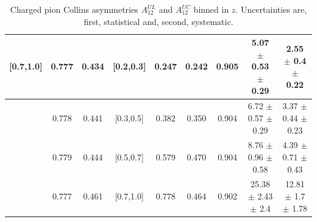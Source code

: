 \documentclass[aps,prX,preprint,groupedaddress,linenumbers]{revtex4-1}
\begin{document}
\begin{table}[H]
\begin{tabular}{|c|c|c|c|c|c|c|c|c|}
[0.7,1.0]	&	0.777	&	0.434	&	[0.2,0.3]	&	0.247	&	0.242	&	0.905	&5.07  $\pm$ 0.53  $\pm$ 0.29   &	2.55  $\pm$ 0.4  $\pm$ 0.22   \\ \hline
[0.7,1.0]	&	0.778	&	0.441	&	[0.3,0.5]	&	0.382	&	0.350	&	0.904	&6.72  $\pm$ 0.57  $\pm$ 0.29   &	3.37  $\pm$ 0.44  $\pm$ 0.23  \\ \hline
[0.7,1.0]	&	0.779	&	0.444	&	[0.5,0.7]	&	0.579	&	0.470	&	0.904	&8.76  $\pm$ 0.96  $\pm$ 0.58   &	4.39  $\pm$ 0.71  $\pm$ 0.43  \\ \hline
[0.7,1.0]	&	0.777	&	0.461	&	[0.7,1.0]	&	0.778	&	0.464	&	0.902	&25.38  $\pm$ 2.43  $\pm$ 2.4   &	12.81  $\pm$ 1.7  $\pm$ 1.78  \\ \hline
\end{tabular}
\caption[Charged pion Collins asymmetries $A_{12}^{UL}$ and $A_{12}^{UC}$ binned in $z$]{Charged pion Collins asymmetries $A_{12}^{UL}$ and $A_{12}^{UC}$ binned in $z$. Uncertainties are, first, statistical and, second, systematic.}
\label{tab:finaluluczbin}
\end{table} 
\end{document}
